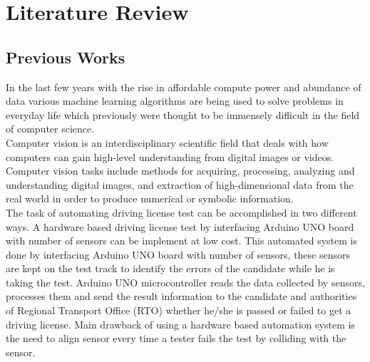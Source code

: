 \chapter{Literature Review}
\section{Previous Works}
In the last few years with the rise in affordable compute power and abundance of data various machine learning algorithms are being used to solve problems in everyday life which previously were thought to be immensely difficult in the field of computer science.
\\
Computer vision is an interdisciplinary scientific field that deals with how computers can gain high-level understanding from digital images or videos. Computer vision tasks include methods for acquiring, processing, analyzing and understanding digital images, and extraction of high-dimensional data from the real world in order to produce numerical or symbolic information.\\
The task of automating driving license test can be accomplished in two different ways. A hardware based driving license test by interfacing Arduino UNO board with number of sensors can be implement at low cost. This automated system is done by interfacing Arduino UNO board with number of sensors, these sensors are kept on the test track to identify the errors of the candidate while he is taking the test. Arduino UNO microcontroller reads the data collected by sensors, processes them and send the result information to the candidate and authorities of Regional Transport Office (RTO) whether he/she is passed or failed to get a driving license\cite{femto_anup}. Main drawback of using a hardware based automation system is the need to align sensor every time a tester fails the test by colliding with the sensor. 
\\
